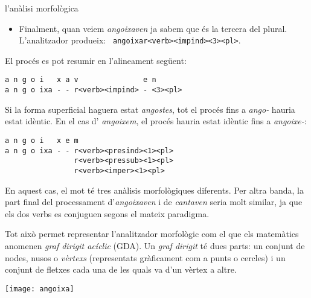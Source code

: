 \begin{persabermes}{l'anàlisi morfològica}
\begin{itemize}
\item Finalment, quan veiem \emph{angoixaven} ja sabem que és la
  tercera del plural. L'analitzador produeix: {\tt
    angoixar<verb><impind><3><pl>}.
\end{itemize}
El procés es pot resumir en l'alineament següent:
\begin{verbatim}
a n g o i   x a v               e n
a n g o ixa - - r<verb><impind> - <3><pl>
\end{verbatim}
Si la forma superficial haguera    estat \emph{angostes}, tot el
procés fins a \emph{ango-} hauria estat idèntic. En el cas d'{\em
  angoixem}, el procés hauria estat idèntic fins a {\em
  angoixe-}:
\begin{verbatim}
a n g o i   x e m
a n g o ixa - - r<verb><presind><1><pl>
                r<verb><pressub><1><pl>
                r<verb><imper><1><pl> 
\end{verbatim}
En aquest cas, el mot té tres anàlisis morfològiques diferents.
Per altra banda, la part final del processament d'\emph{angoixaven} i
de \emph{cantaven} seria molt similar, ja que els dos verbs es
conjuguen segons el mateix paradigma. 


Tot això permet representar l'analitzador morfològic com el que els
matemà\-tics anomenen \emph{graf dirigit acíclic} (GDA). Un \emph{graf
  dirigit} té dues parts: un conjunt de nodes, nusos o \emph{vèrtexs}
(representats gràficament com a punts o cercles) i un conjunt de
fletxes cada una de les quals va d'un vèrtex a altre. 

\texttt{[image: angoixa]}



\end{persabermes}
